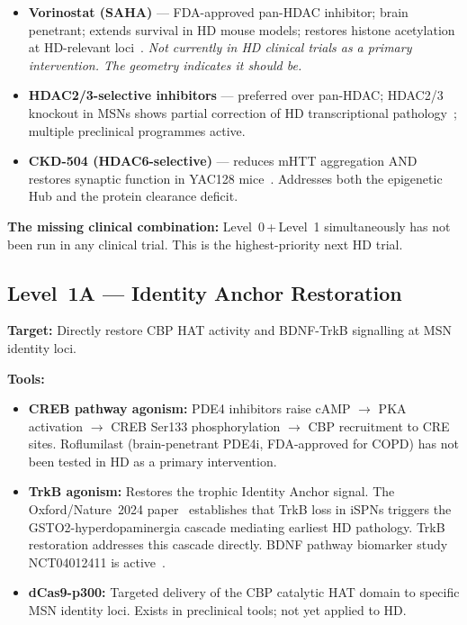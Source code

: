 \documentclass[12pt,a4paper]{article}
\begin{document}
\begin{itemize}
  \item \textbf{Vorinostat (SAHA)} --- FDA-approved
    pan-HDAC inhibitor; brain penetrant; extends survival
    in HD mouse models; restores histone acetylation at
    HD-relevant loci~\cite{HDACiReview2020}.
    \emph{Not currently in HD clinical trials as a primary
    intervention. The geometry indicates it should be.}

  \item \textbf{HDAC2/3-selective inhibitors} ---
    preferred over pan-HDAC; HDAC2/3 knockout in MSNs
    shows partial correction of HD transcriptional
    pathology~\cite{eLife2020}; multiple preclinical
    programmes active.

  \item \textbf{CKD-504 (HDAC6-selective)} --- reduces
    mHTT aggregation AND restores synaptic function in
    YAC128 mice~\cite{CKD504_2023}. Addresses both the
    epigenetic Hub and the protein clearance deficit.
\end{itemize}

\textbf{The missing clinical combination:}
Level~0\,+\,Level~1 simultaneously has not been run in
any clinical trial. This is the highest-priority next HD
trial.

\subsection{Level~1A --- Identity Anchor Restoration}

\textbf{Target:} Directly restore CBP HAT activity and
BDNF-TrkB signalling at MSN identity loci.

\medskip\noindent\textbf{Tools:}

\begin{itemize}
  \item \textbf{CREB pathway agonism:} PDE4 inhibitors
    raise cAMP $\to$ PKA activation $\to$ CREB Ser133
    phosphorylation $\to$ CBP recruitment to CRE sites.
    Roflumilast (brain-penetrant PDE4i, FDA-approved for
    COPD) has not been tested in HD as a primary
    intervention.

  \item \textbf{TrkB agonism:} Restores the trophic
    Identity Anchor signal. The Oxford/Nature~2024
    paper~\cite{Oxford2024} establishes that TrkB loss
    in iSPNs triggers the GSTO2-hyperdopaminergia cascade
    mediating earliest HD pathology. TrkB restoration
    addresses this cascade directly. BDNF pathway
    biomarker study NCT04012411 is
    active~\cite{BDNF_NCT}.

  \item \textbf{dCas9-p300:} Targeted delivery of the
    CBP catalytic HAT domain to specific MSN identity
    loci. Exists in preclinical tools; not yet applied
    to HD.
\end{itemize}
\end{document}
